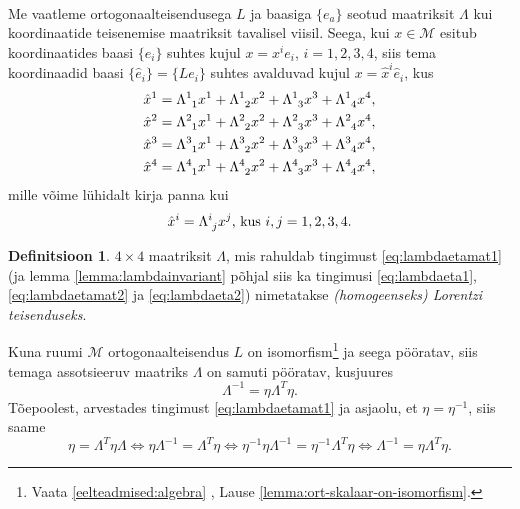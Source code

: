 \documentclass[12pt]{article}
\theoremstyle{plain}
\theoremstyle{definition}
\newtheorem{definitsioon}{Definitsioon}[section]
\numberwithin{equation}{section}
\def\M{{\mathcal M}}
\begin{document}
\paragraph*{}
Me vaatleme ortogonaalteisendusega $L$ ja baasiga $\{e_a\}$ seotud 
maatriksit $\Lambda$ kui koordinaatide teisenemise maatriksit 
tavalisel viisil. Seega, kui $x \in \M$ esitub koordinaatides 
baasi $\{e_i\}$ suhtes kujul $x = x^i e_i$, $i = 1, 2, 3, 4$, siis 
tema koordinaadid baasi $\{\hat{e}_i\} = \{Le_i\}$ suhtes avalduvad 
kujul $x = \hat{x}^i \hat{e}_i$, kus
\begin{align*}
\hat{x}^1 &= \Lambda\indices{^1_1} x^1 + \Lambda\indices{^1_2} x^2 + 
\Lambda\indices{^1_3} x^3 + \Lambda\indices{^1_4} x^4, \\
\hat{x}^2 &= \Lambda\indices{^2_1} x^1 + \Lambda\indices{^2_2} x^2 + 
\Lambda\indices{^2_3} x^3 + \Lambda\indices{^2_4} x^4, \\
\hat{x}^3 &= \Lambda\indices{^3_1} x^1 + \Lambda\indices{^3_2} x^2 + 
\Lambda\indices{^3_3} x^3 + \Lambda\indices{^3_4} x^4, \\
\hat{x}^4 &= \Lambda\indices{^4_1} x^1 + \Lambda\indices{^4_2} x^2 + 
\Lambda\indices{^4_3} x^3 + 
\Lambda\indices{^4_4} x^4,
\end{align*}
mille võime lühidalt kirja panna kui
\begin{equation*}
\hat{x}^i = \Lambda\indices{^i_j} x^j \text{, kus } i,j=1, 2, 3, 4.
\end{equation*}

\begin{definitsioon}
$4 \times 4$ maatriksit $\Lambda$, mis rahuldab tingimust 
\ref{eq:lambdaetamat1} (ja lemma \ref{lemma:lambdainvariant} 
põhjal siis ka tingimusi \ref{eq:lambdaeta1}, \ref{eq:lambdaetamat2} 
ja \ref{eq:lambdaeta2}) nimetatakse \emph{(homogeenseks) Lorentzi 
teisenduseks}.
\end{definitsioon}

Kuna ruumi $\M$ ortogonaalteisendus $L$ on isomorfism\footnote{
{Vaata \ref{eelteadmised:algebra} 
, Lause 
\ref{lemma:ort-skalaar-on-isomorfism}.}} 
ja seega pööratav, siis temaga assotsieeruv maatriks $\Lambda$ on 
samuti pööratav, kusjuures
\begin{equation} \label{eq:lambda-1lambda-trans}
\Lambda^{-1} = \eta \Lambda^T \eta.
\end{equation}
Tõepoolest, arvestades tingimust \ref{eq:lambdaetamat1} ja asjaolu, 
et $\eta = \eta^{-1}$, siis saame
\begin{equation*}
\eta = \Lambda^T \eta \Lambda \iff \eta \Lambda^{-1} = 
\Lambda^T \eta \iff \eta^{-1} \eta \Lambda^{-1} = 
\eta^{-1} \Lambda^T \eta \iff \Lambda^{-1} = \eta \Lambda^T \eta.
\end{equation*}
\end{document}
